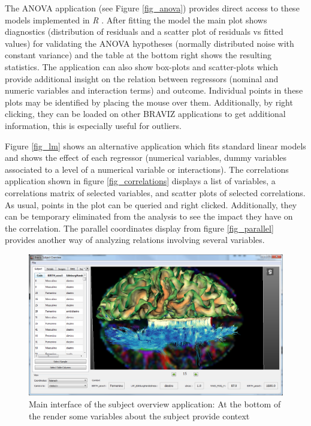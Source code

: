 \documentclass[twocolumn]{svjour3}
\begin{document}
The ANOVA application (see Figure \ref{fig_anova}) provides direct access to these models implemented in \emph{R} \cite{team_r:_2012}. After fitting the model the main plot shows diagnostics (distribution of residuals and a scatter plot of residuals vs fitted values) for validating the ANOVA hypotheses (normally distributed noise with constant variance) and the table at the bottom right shows the resulting statistics. The application can also show box-plots and scatter-plots which provide additional insight on the relation between regressors (nominal and numeric variables and interaction terms) and outcome. Individual points in these plots may be identified by placing the mouse over them. Additionally, by right clicking, they can be loaded on other BRAVIZ applications to get additional information, this is especially useful for outliers.

Figure \ref{fig_lm} shows an alternative application which fits standard linear models and shows the effect of each regressor (numerical variables, dummy variables associated to a level of a numerical variable or interactions). The correlations application shown in figure \ref{fig_correlations} displays a list of variables, a correlations matrix of selected variables, and scatter plots of selected correlations. As usual, points in the plot can be queried and right clicked. Additionally, they can be temporary eliminated from the analysis to see the impact they have on the correlation. The parallel coordinates display from figure \ref{fig_parallel} provides another way of analyzing relations involving several variables.

\begin{figure}
\begin{center}
\includegraphics[width=\linewidth]{figures/subj_overview_full.PNG}
\end{center}
 \caption{\label{fig_subject}Main interface of the subject overview application: At the bottom of the render some variables about the subject provide context}
\end{figure}
\end{document}
